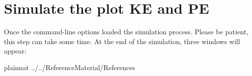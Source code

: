 \documentclass[12pt, titlepage]{article}
\begin{document}

\section{Simulate the plot KE and PE}

Once the command-line options loaded the simulation process. 
Please be patient, this step can take some time. 
At the end of the simulation, three windows will appear:


 {plainnat}
 {../../ReferenceMaterial/References}
\end{document}
